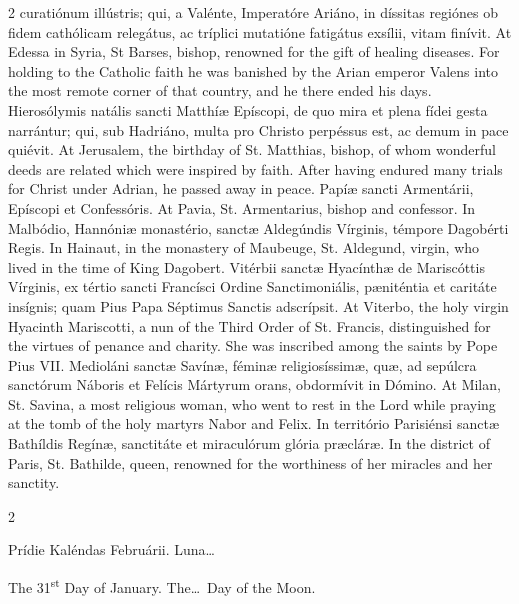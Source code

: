 \begin{paracol}{2}
 curatiónum illústris; qui, a Valénte, Imperatóre Ariáno, in díssitas 
 regiónes ob fidem cathólicam relegátus, ac tríplici mutatióne fatigátus 
 exsílii, vitam finívit.
\switchcolumn
{}
At Edessa in Syria, St Barses, bishop, renowned for the gift of healing 
 diseases. For holding to the Catholic faith he was banished by the 
 Arian emperor Valens into the most remote corner of that country, and he 
 there ended his days.
\switchcolumn*
{}
Hierosólymis natális sancti Matthíæ Epíscopi, 
 de quo mira et plena fídei gesta narrántur; qui, sub Hadriáno, multa pro 
 Christo perpéssus est, ac demum in pace quiévit.
\switchcolumn
{}
At Jerusalem, the birthday of St. Matthias, bishop, of whom wonderful deeds 
 are related which were inspired by faith. After having endured many 
 trials for Christ under Adrian, he passed away in peace.
\switchcolumn*
{}
Papíæ sancti Armentárii, Epíscopi et 
 Confessóris.
\switchcolumn
{}
At Pavia, St. Armentarius, bishop and confessor.
\switchcolumn*
{}
In Malbódio, Hannóniæ monastério, sanctæ 
 Aldegúndis Vírginis, témpore Dagobérti Regis.
\switchcolumn
{}
In Hainaut, in the monastery of Maubeuge, St. Aldegund, virgin, who lived in 
 the time of King Dagobert.
\switchcolumn*
{}
Vitérbii sanctæ Hyacínthæ de Mariscóttis 
 Vírginis, ex tértio sancti Francísci Ordine Sanctimoniális, pæniténtia et 
 caritáte insígnis; quam Pius Papa Séptimus Sanctis adscrípsit.
\switchcolumn
{}
At Viterbo, the holy virgin Hyacinth Mariscotti, a nun of the Third Order of 
 St. Francis, distinguished for the virtues of penance and charity. She 
 was inscribed among the saints by Pope Pius VII.
\switchcolumn*
{}
Medioláni sanctæ Savínæ, féminæ religiosíssimæ, 
 quæ, ad sepúlcra sanctórum Náboris et Felícis Mártyrum orans, obdormívit in 
 Dómino.
\switchcolumn
{}
At Milan, St. Savina, a most religious woman, who went to rest in the Lord 
 while praying at the tomb of the holy martyrs Nabor and Felix.
\switchcolumn*
{}
In território Parisiénsi sanctæ Bathíldis 
 Regínæ, sanctitáte et miraculórum glória præcláræ.
\switchcolumn
{}
In the district of Paris, St. Bathilde, queen, renowned for the worthiness 
 of her miracles and her sanctity.
\switchcolumn*
{}
\end{paracol}


\begin{paracol}{2}
\begin{center}{\color{gregoriocolor} Prídie Kaléndas Februárii. 
 Luna\dots\ }\end{center}
\switchcolumn
{}
\begin{center}{\color{gregoriocolor} The 31\textsuperscript{st} Day of 
 January. The\dots\ Day of the Moon.}\end{center}
\end{paracol}

